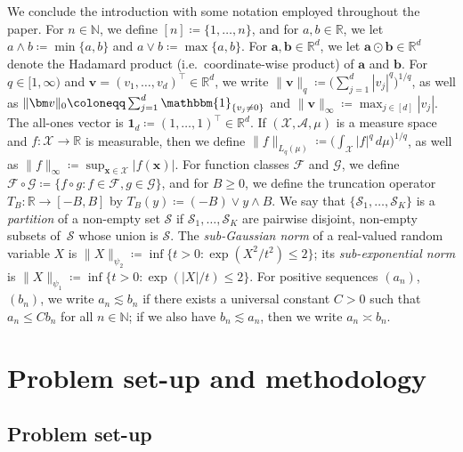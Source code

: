 \documentclass[12pt]{article}
\begin{document}
We conclude the introduction with some notation employed throughout the paper.  For $n\in\mathbb{N}$, we define $[n] \coloneqq \{1,\ldots,n\}$, and for $a,b\in\mathbb{R}$, we let $a\wedge b \coloneqq \min\{a,b\}$ and $a\vee b \coloneqq \max\{a,b\}$.  For $\bm{a},\bm{b}\in\mathbb{R}^d$, we let $\bm{a}\odot \bm{b} \in \mathbb{R}^d$ denote the Hadamard product (i.e.~coordinate-wise product) of $\bm{a}$ and $\bm{b}$.  For $q \in [1,\infty)$ and $\bm v = (v_1,\ldots,v_d)^\top \in \mathbb{R}^d$, we write $\|\bm v\|_q \coloneqq \bigl(\sum_{j=1}^d |v_j|^q\bigr)^{1/q}$, as well as $\|\bm v\|_0 \coloneqq \sum_{j=1}^d \mathbbm{1}_{\{v_j \neq 0\}}$ and $\|\bm v\|_{\infty} \coloneqq \max_{j \in [d]} |v_j|$.  The all-ones vector is $\bm{1}_d \coloneqq (1,\ldots,1)^\top \in \mathbb{R}^d$.  If $(\mathcal{X},\mathcal{A},\mu)$ is a measure space and $f:\mathcal{X} \rightarrow \mathbb{R}$ is measurable, then we define $\|f\|_{L_q(\mu)} \coloneqq \bigl(\int_{\mathcal{X}} |f|^q \, d\mu\bigr)^{1/q}$, as well as $\|f\|_\infty \coloneqq \sup_{\bm x \in \mathcal{X}} |f(\bm x)|$.  For function classes $\mathcal{F}$ and $\mathcal{G}$, we define $\mathcal{F}\circ\mathcal{G} \coloneqq \{f \circ g:f \in \mathcal{F}, g \in \mathcal{G}\}$, and for $B\geq 0$, we define the truncation operator $T_B : \mathbb{R} \to [-B,B]$ by $T_B(y) \coloneqq (-B) \vee y \wedge B$.  We say that $\{\mathcal{S}_1,\ldots,\mathcal{S}_K\}$ is a \emph{partition} of a non-empty set $\mathcal{S}$ if $\mathcal{S}_1,\ldots,\mathcal{S}_K$ are pairwise disjoint, non-empty subsets of~$\mathcal{S}$ whose union is $\mathcal{S}$.  The \emph{sub-Gaussian norm} of a real-valued random variable $X$ is $\|X\|_{\psi_2} \coloneqq \inf \{t>0 : \exp(X^2/t^2) \leq 2\}$; its \emph{sub-exponential norm} is $\|X\|_{\psi_1} \coloneqq \inf \{t>0 : \exp(|X|/t) \leq 2\}$.  For positive sequences $(a_n)$, $(b_n)$, we write $a_n \lesssim b_n$ if there exists a universal constant $C > 0$ such that $a_n \leq C b_n$ for all $n \in \mathbb{N}$; if we also have $b_n \lesssim a_n$, then we write $a_n \asymp b_n$. 

\section{Problem set-up and methodology} \label{sec:setup-method}
\subsection{Problem set-up} \label{sec:setup}
\end{document}

